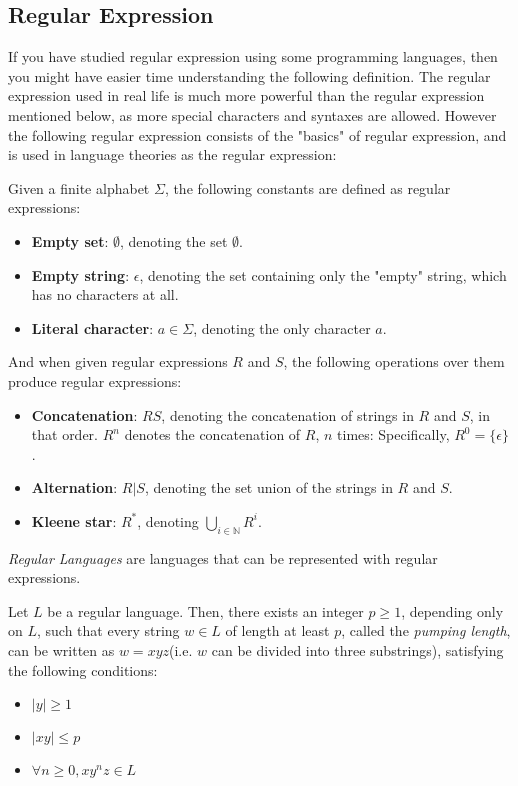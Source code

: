 \documentclass{report}
\begin{document}
		\subsection{Regular Expression}
			If you have studied regular expression using some programming languages, then you might have easier time understanding the following definition. The regular expression used in real life is much more powerful than the regular expression mentioned below, as more special characters and syntaxes are allowed. However the following regular expression consists of the "basics" of regular expression, and is used in language theories as the regular expression:
			\begin{defn} \label{def_RE}
				Given a finite alphabet $\Sigma$, the following constants are defined as regular expressions:
				\begin{itemize}
					\item \textbf{Empty set}: $\emptyset$, denoting the set $\emptyset$.
					\item \textbf{Empty string}: $\epsilon$, denoting the set containing only the "empty" string, which has no characters at all.
					\item \textbf{Literal character}: $a \in \Sigma$, denoting the only character $a$.
				\end{itemize}
				And when given regular expressions $R$ and $S$, the following operations over them produce regular expressions:
				\begin{itemize}
					\item \textbf{Concatenation}: $RS$, denoting the concatenation of strings in $R$ and $S$, in that order.
						\subitem $R^n$ denotes the concatenation of $R$, $n$ times: Specifically, $R^0=\{\epsilon\}$.
					\item \textbf{Alternation}: $R|S$, denoting the set union of the strings in $R$ and $S$.
					\item \textbf{Kleene star}: $R^*$, denoting $\bigcup_{i \in \mathbb{N}}R^i$.
				\end{itemize}
			\end{defn}
			
			\begin{defn} \label{def_RL}
				\emph{Regular Languages} are languages that can be represented with regular expressions.
			\end{defn}
			
			\begin{thm} \label{thm_pumping_lemma_RL}
				Let $L$ be a regular language. Then, there exists an integer $p \ge 1$, depending only on $L$, such that every string $w \in L$ of length at least $p$, called the \emph{pumping length}, can be written as $w=xyz$(i.e. $w$ can be divided into three substrings), satisfying the following conditions:
				\begin{itemize}
					\item $|y| \ge 1$
					\item $|xy| \le p$
					\item $\forall n \ge 0, xy^nz \in L$
				\end{itemize}
			\end{thm}
		
\end{document}
